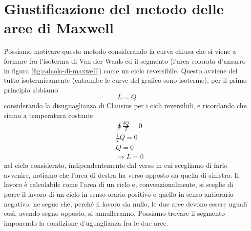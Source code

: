 \documentclass[10pt,a4paper]{article}
\begin{document}
\section{Giustificazione del metodo delle aree di Maxwell}
Possiamo motivare questo metodo considerando la curva chiusa che si viene a formare fra l'isoterma di Van der Waals ed il segmento (l'area colorata d'azzurro in figura \ref{fig:calcolo-di-maxwell}) come un ciclo reversibile. Questo avviene del tutto isotermicamente (entrambe le curve del grafico sono isoterme), per il primo principio abbiamo
\[L = Q\]
considerando la disuguaglianza di Clausius per i cicli reversibili, e ricordando che siamo a temperatura costante
\begin{align*}
	&\oint\frac{\delta Q}{T}= 0\\
	&\frac{1}{T}Q=0\\
	&Q=0\\
	&\Rightarrow L=0
\end{align*} 
nel ciclo considerato, indipendentemente dal verso in cui scegliamo di farlo avvenire, notiamo che l'area di destra ha verso opposto da quella di sinistra. Il lavoro è calcolabile come l'area di un ciclo e, convenzionalmente, si sceglie di porre il lavoro di un ciclo in senso orario positivo e quello in senso antiorario negativo. ne segue che, perché il lavoro sia nullo, le due aree devono essere uguali così, avendo segno opposto, si annulleranno. Possiamo trovare il segmento imponendo la condizione d'uguaglianza fra le due aree.  
\newpage
\tableofcontents
\end{document}
